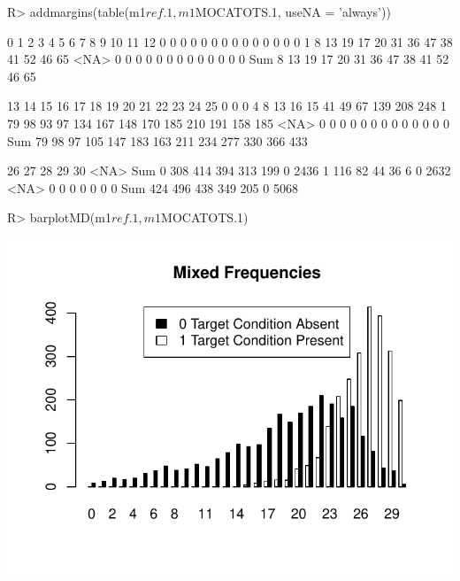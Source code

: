 \documentclass[
  nojss]{jss}
\begin{document}
\begin{CodeChunk}

\begin{CodeInput}
R> addmargins(table(m1$ref.1, m1$MOCATOTS.1, useNA = 'always'))
\end{CodeInput}

\begin{CodeOutput}
      
          0    1    2    3    4    5    6    7    8    9   10   11   12
  0       0    0    0    0    0    0    0    0    0    0    0    0    0
  1       8   13   19   17   20   31   36   47   38   41   52   46   65
  <NA>    0    0    0    0    0    0    0    0    0    0    0    0    0
  Sum     8   13   19   17   20   31   36   47   38   41   52   46   65
      
         13   14   15   16   17   18   19   20   21   22   23   24   25
  0       0    0    4    8   13   16   15   41   49   67  139  208  248
  1      79   98   93   97  134  167  148  170  185  210  191  158  185
  <NA>    0    0    0    0    0    0    0    0    0    0    0    0    0
  Sum    79   98   97  105  147  183  163  211  234  277  330  366  433
      
         26   27   28   29   30 <NA>  Sum
  0     308  414  394  313  199    0 2436
  1     116   82   44   36    6    0 2632
  <NA>    0    0    0    0    0    0    0
  Sum   424  496  438  349  205    0 5068
\end{CodeOutput}

\begin{CodeInput}
R> barplotMD(m1$ref.1, m1$MOCATOTS.1)
\end{CodeInput}


\begin{center}\includegraphics{UI_RPV_files/figure-latex/unnamed-chunk-4-1} \end{center}

\end{CodeChunk}
\end{document}
